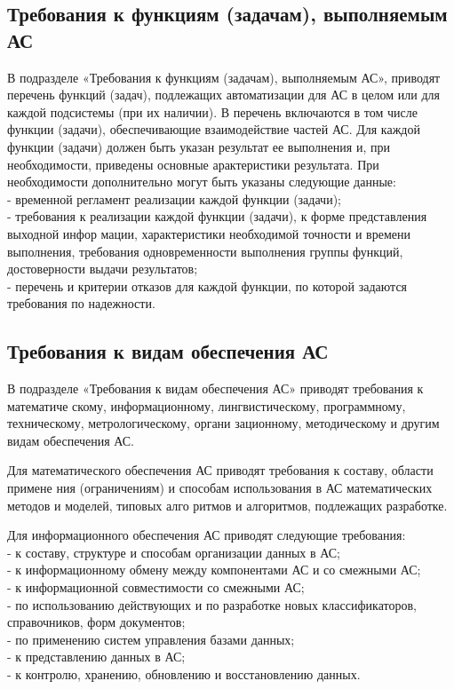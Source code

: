 {\subsection{Требования к функциям (задачам), выполняемым АС}
В подразделе «Требования к функциям (задачам), выполняемым АС», приводят перечень функций (задач), подлежащих автоматизации для АС в целом или для каждой подсистемы (при их наличии). В перечень включаются в том числе функции  (задачи), обеспечивающие взаимодействие частей АС.
Для каждой функции (задачи) должен быть указан результат ее выполнения и, при необходимости, приведены основные арактеристики результата. При необходимости дополнительно могут быть указаны следующие данные:\\
- временной регламент реализации каждой функции (задачи);\\
- требования к реализации каждой функции (задачи), к форме представления выходной инфор мации, характеристики необходимой точности и времени выполнения, требования одновременности выполнения группы функций, достоверности выдачи результатов;\\
- перечень и критерии отказов для каждой функции, по которой задаются требования по надежности.\\
\subsection{Требования к видам обеспечения АС}
В подразделе «Требования к видам обеспечения АС» приводят требования к математиче
скому, информационному, лингвистическому, программному, техническому, метрологическому, органи
зационному, методическому и другим видам обеспечения АС.

Для математического обеспечения АС приводят требования к составу, области примене
ния (ограничениям) и способам использования в АС математических методов и моделей, типовых алго
ритмов и алгоритмов, подлежащих разработке.

Для информационного обеспечения АС приводят следующие требования:\\
- к составу, структуре и способам организации данных в АС;\\
- к информационному обмену между компонентами АС и со смежными АС;\\
- к информационной совместимости со смежными АС;\\
- по использованию действующих и по разработке новых классификаторов, справочников, форм документов;\\
- по применению систем управления базами данных;\\
- к представлению данных в АС;\\
- к контролю, хранению, обновлению и восстановлению данных.\\

}
